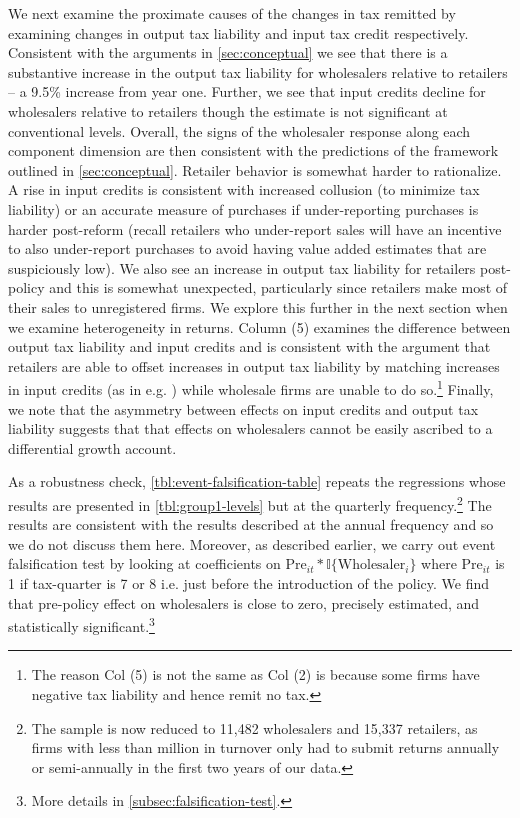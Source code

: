 We next examine the proximate causes of the changes in tax remitted by examining changes in output tax liability and input tax credit respectively. Consistent with the arguments in \cref{sec:conceptual} we see that there is a substantive increase in the output tax liability for wholesalers relative to retailers -- a 9.5\% increase from year one. Further, we see that input credits decline for wholesalers relative to retailers though the estimate is not significant at conventional levels. Overall, the signs of the wholesaler response along each component dimension are then consistent with the predictions of the framework outlined in \cref{sec:conceptual}. Retailer behavior is somewhat harder to rationalize. A rise in input credits is consistent with increased collusion (to minimize tax liability) or an accurate measure of purchases if under-reporting purchases is harder post-reform (recall retailers who under-report sales will have an incentive to also under-report purchases to avoid having value added estimates that are suspiciously low). We also see an increase in output tax liability for retailers post-policy and this is somewhat unexpected, particularly since retailers make most of their sales to unregistered firms. We explore this further in the next section when we examine heterogeneity in returns. Column (5) examines the difference between  output tax liability and input credits and is consistent with the argument that retailers are able to offset increases in output tax liability by matching increases in input credits (as in e.g. \cite{Carrilloetal:2017}) while wholesale firms are unable to do so.\footnote{The reason Col (5) is not the same as Col (2) is because some firms have negative tax liability and hence remit no tax.} Finally, we note that the asymmetry between effects on input credits and output tax liability suggests that that effects on wholesalers cannot be easily ascribed to a differential growth account. 

As a robustness check, \cref{tbl:event-falsification-table} repeats the regressions whose results are presented in \cref{tbl:group1-levels} but at the quarterly frequency.\footnote{The sample is now reduced to 11,482 wholesalers and 15,337 retailers, as firms with less than  million in turnover only had to submit returns annually or semi-annually in the first two years of our data.} The results are consistent with the results described at the annual frequency and so we do not discuss them here. Moreover, as described earlier, we carry out event falsification test by looking at coefficients on $\text{Pre}_{it}*\mathbb{I}\{\text{Wholesaler}_{i}\}$ where $\text{Pre}_{it}$ is 1 if tax-quarter is 7 or 8 i.e. just before the introduction of the policy. We find that pre-policy effect on wholesalers is close to zero, precisely estimated, and statistically significant.\footnote{More details in \cref{subsec:falsification-test}.}

